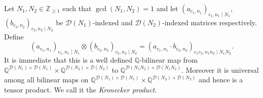 \documentclass[12pt]{amsart}
\numberwithin{equation}{section}
\theoremstyle{plain}
\theoremstyle{definition}
\theoremstyle{remark}
\newcommand\numQ{\mathbb{Q}}
\newcommand\numgeq[2]{\mathbb{#1}_{\geq #2}}
\begin{document}
Let $N_1,N_2\in\numgeq{Z}{1}$ such that $\gcd(N_1,N_2)=1$ and let $(a_{c_1,n_1})_{c_1,n_1\mid N_1}$, $(b_{c_2,n_2})_{c_2,n_2\mid N_2}$ be $\mathscr{D}(N_1)$-indexed and $\mathscr{D}(N_2)$-indexed matrices respectively. Define
\begin{equation*}
(a_{c_1,n_1})_{c_1,n_1\mid N_1} \otimes(b_{c_2,n_2})_{c_2,n_2\mid N_2}=(a_{c_1,n_1}\cdot b_{c_2,n_2})_{c_1c_2,n_1n_2\mid N_1N_2}.
\end{equation*}
It is immediate that this is a well defined $\numQ$-bilinear map from $\numQ^{\mathscr{D}(N_1)\times\mathscr{D}(N_1)}\times\numQ^{\mathscr{D}(N_2)\times\mathscr{D}(N_2)}$ to $\numQ^{\mathscr{D}(N_1N_2)\times\mathscr{D}(N_1N_2)}$. Moreover it is universal among all bilinear maps on $\numQ^{\mathscr{D}(N_1)\times\mathscr{D}(N_1)}\times\numQ^{\mathscr{D}(N_2)\times\mathscr{D}(N_2)}$ and hence is a tensor product. We call it the \emph{Kronecker product}.
\end{document}
